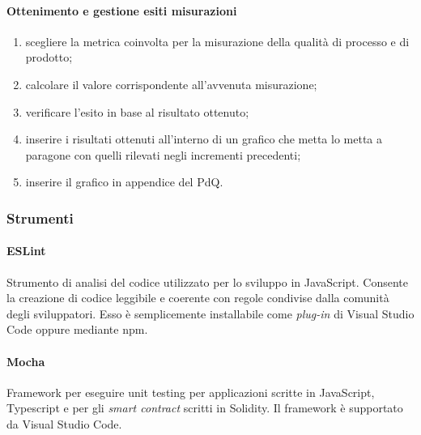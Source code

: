 \paragraph{Ottenimento e gestione esiti misurazioni}
\begin{enumerate}
	\item scegliere la metrica coinvolta per la misurazione della qualità di processo e di prodotto;
	\item calcolare il valore corrispondente all'avvenuta misurazione;
	\item verificare l'esito in base al risultato ottenuto;
	\item inserire i risultati ottenuti all'interno di un grafico che metta lo metta a paragone con quelli rilevati negli incrementi precedenti;
	\item inserire il grafico in appendice del PdQ.
\end{enumerate}

\subsubsection{Strumenti}
\paragraph{ESLint}
Strumento di analisi del codice utilizzato per lo sviluppo in JavaScript. Consente la creazione di codice leggibile e coerente con regole condivise dalla comunità degli sviluppatori. Esso è semplicemente installabile come \textit{plug-in\glo} di Visual Studio Code oppure mediante npm.

\paragraph{Mocha}
Framework per eseguire unit testing per applicazioni scritte in JavaScript, Typescript e per gli \textit{smart contract\glo} scritti in Solidity. Il framework è supportato da Visual Studio Code.

